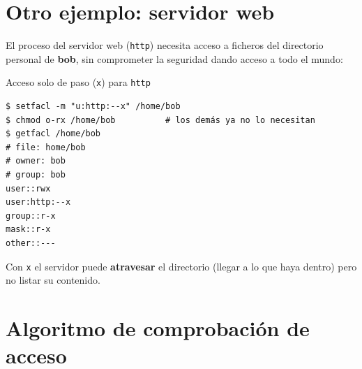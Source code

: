 \documentclass[11pt,a4paper]{report}
\begin{document}
\section{Otro ejemplo: servidor web}
 
El proceso del servidor web (\texttt{http}) necesita acceso a ficheros del directorio personal de \textbf{bob}, sin comprometer la seguridad dando acceso a todo el mundo:
 
\begin{ejemplo}{Acceso solo de paso (\texttt{x}) para \texttt{http}}
\begin{verbatim}
$ setfacl -m "u:http:--x" /home/bob
$ chmod o-rx /home/bob          # los demás ya no lo necesitan
$ getfacl /home/bob
# file: home/bob
# owner: bob
# group: bob
user::rwx
user:http:--x
group::r-x
mask::r-x
other::---
\end{verbatim}
\end{ejemplo}
 
Con \texttt{x} el servidor puede \textbf{atravesar} el directorio (llegar a lo que haya dentro) pero no listar su contenido.
 
\section{Algoritmo de comprobación de acceso}
 
\end{document}
